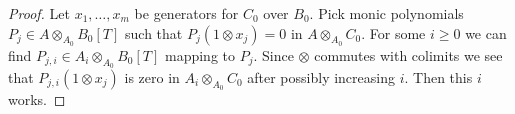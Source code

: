 \documentclass[10pt,a4paper]{amsart}
\theoremstyle{plain}
\theoremstyle{definition}
\theoremstyle{remark}
\numberwithin{equation}{subsection}
\begin{document}
\begin{proof}
Let $x_1, \ldots, x_m$ be generators for $C_0$ over $B_0$.
Pick monic polynomials $P_j \in A \otimes_{A_0} B_0[T]$ such
that $P_j(1 \otimes x_j) = 0$ in $A \otimes_{A_0} C_0$. For some
$i \geq 0$ we can find $P_{j, i} \in A_i \otimes_{A_0} B_0[T]$
mapping to $P_j$. Since $\otimes$
commutes with colimits we see that $P_{j, i}(1 \otimes x_j)$ is zero
in $A_i \otimes_{A_0} C_0$ after possibly increasing $i$.
Then this $i$ works.
\end{proof}
\end{document}
